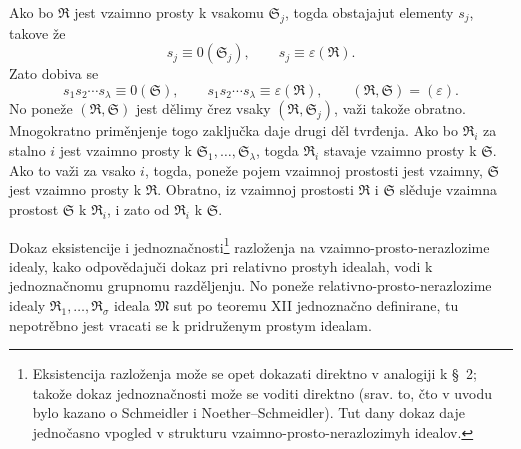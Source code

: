 \documentclass[11pt]{article}
\newcommand{\ideal}[1]{\mathfrak{#1}}
\begin{document}
Ako bo \(\ideal R\) jest vzaimno prosty k vsakomu \(\ideal S_j\), togda obstajajut elementy \(s_j\), takove že
\[
 s_j\equiv0(\ideal S_j),
 \qquad
 s_j\equiv\varepsilon(\ideal R).
\]
Zato dobiva se
\[
 s_1s_2\cdots s_\lambda\equiv0(\ideal S),
 \qquad
 s_1s_2\cdots s_\lambda\equiv\varepsilon(\ideal R),
 \qquad
 (\ideal R,\ideal S)=(\varepsilon).
\]
No poneže \((\ideal R,\ideal S)\) jest dělimy črez vsaky \((\ideal R,\ideal S_j)\), važi takože obratno. Mnogokratno priměnjenje togo zaključka daje drugi děl tvrđenja. Ako bo \(\ideal R_i\) za stalno \(i\) jest vzaimno prosty k \(\ideal S_1,\ldots,\ideal S_\lambda\), togda \(\ideal R_i\) stavaje vzaimno prosty k \(\ideal S\). Ako to važi za vsako \(i\), togda, poneže pojem vzaimnoj prostosti jest vzaimny, \(\ideal S\) jest vzaimno prosty k \(\ideal R\). Obratno, iz vzaimnoj prostosti \(\ideal R\) i \(\ideal S\) slěduje vzaimna prostost \(\ideal S\) k \(\ideal R_i\), i zato od \(\ideal R_i\) k \(\ideal S\).

Dokaz eksistencije i jednoznačnosti\footnote{Eksistencija razloženja može se opet dokazati direktno v analogiji k \S~2; takože dokaz jednoznačnosti može se voditi direktno (srav. to, čto v uvodu bylo kazano o Schmeidler i Noether--Schmeidler). Tut dany dokaz daje jednočasno vpogled v strukturu vzaimno-prosto-nerazlozimyh idealov.} razloženja na vzaimno-prosto-nerazlozime idealy, kako odpovědajuči dokaz pri relativno prostyh idealah, vodi k jednoznačnomu grupnomu razděljenju. No poneže relativno-prosto-nerazlozime idealy \(\ideal R_1,\ldots,\ideal R_\sigma\) ideala \(\ideal M\) sut po teoremu XII jednoznačno definirane, tu nepotrěbno jest vracati se k pridruženym prostym idealam.
\end{document}
